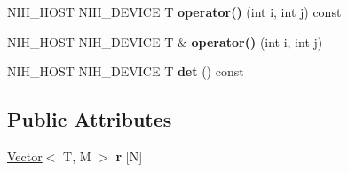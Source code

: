 \begin{DoxyCompactItemize}
\item 
\hypertarget{structnih_1_1_matrix_ae6ddc1c3fb0eb0318233f95e7d382894}{
\-N\-I\-H\-\_\-\-H\-O\-S\-T \-N\-I\-H\-\_\-\-D\-E\-V\-I\-C\-E \-T {\bfseries operator()} (int i, int j) const }
\label{structnih_1_1_matrix_ae6ddc1c3fb0eb0318233f95e7d382894}

\item 
\hypertarget{structnih_1_1_matrix_af4a309500232a6e6663faa045fe258d7}{
\-N\-I\-H\-\_\-\-H\-O\-S\-T \-N\-I\-H\-\_\-\-D\-E\-V\-I\-C\-E \-T \& {\bfseries operator()} (int i, int j)}
\label{structnih_1_1_matrix_af4a309500232a6e6663faa045fe258d7}

\item 
\hypertarget{structnih_1_1_matrix_a20d0e32d5bf4cbea9002479abf0d034b}{
\-N\-I\-H\-\_\-\-H\-O\-S\-T \-N\-I\-H\-\_\-\-D\-E\-V\-I\-C\-E \-T {\bfseries det} () const }
\label{structnih_1_1_matrix_a20d0e32d5bf4cbea9002479abf0d034b}

\end{DoxyCompactItemize}
\subsection*{\-Public \-Attributes}
\begin{DoxyCompactItemize}
\item 
\hypertarget{structnih_1_1_matrix_a412525ee29436819434578b8dbd60a1e}{
\hyperlink{structnih_1_1_vector}{\-Vector}$<$ \-T, \-M $>$ {\bfseries r} \mbox{[}\-N\mbox{]}}
\label{structnih_1_1_matrix_a412525ee29436819434578b8dbd60a1e}

\end{DoxyCompactItemize}
